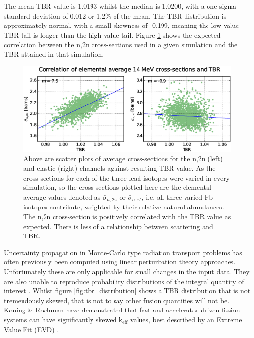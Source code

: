 The mean TBR value is 1.0193 whilst the median is 1.0200, with a one sigma standard deviation of 0.012 or 1.2\% of the mean. The TBR distribution is approximately normal, with a small skewness of -0.199, meaning the low-value TBR tail is longer than the high-value tail. Figure \ref{fig:tbr_n2n} shows the expected correlation between the n,2n cross-sections used in a given simulation and the TBR attained in that simulation.

\begin{figure}[ht]
  \centering
	\includegraphics[width=\textwidth]{pb_tbr_n2n_el_corr}
	\caption{Above are scatter plots of average cross-sections for the n,2n (left) and elastic (right) channels against resulting TBR value. As the cross-sections for each of the three lead isotopes were varied in every simulation, so the cross-sections plotted here are the elemental average values denoted as $\bar{\sigma}_{n,2n}$ or $\bar{\sigma}_{n,n'}$, i.e. all three varied Pb isotopes contribute, weighted by their relative natural abundances. The n,2n cross-section is positively correlated with the TBR value as expected. There is less of a relationship between scattering and TBR.}
	\label{fig:tbr_n2n}
\end{figure}

Uncertainty propagation in Monte-Carlo type radiation transport problems has often previously been computed using linear perturbation theory approaches. Unfortunately these are only applicable for small changes in the input data. They are also unable to reproduce probability distributions of the integral quantity of interest \cite{Rising2012}. Whilst figure \ref{fig:tbr_distribution} shows a TBR distribution that is not tremendously skewed, that is not to say other fusion quantities will not be. Koning \& Rochman have demonstrated that fast and accelerator driven fission systems can have significantly skewed k$_{\mbox{eff}}$ values, best described by an Extreme Value Fit (EVD) \cite{Koning2008}.

